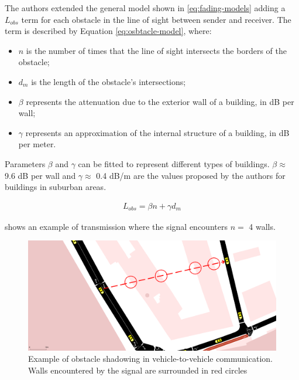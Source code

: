 		The authors extended the general model shown in \ref{eq:fading-models} adding a $L_{obs}$ term for each obstacle in the line of sight between sender and receiver. The term is described by Equation \ref{eq:osbtacle-model}, where:
		\begin{itemize}
			\item $n$ is the number of times that the line of sight intersects the borders of the obstacle;
			\item $d_m$ is the length of the obstacle's intersections;
			\item $\beta$ represents the attenuation due to the exterior wall of a building, in dB per wall;
			\item $\gamma$ represents an approximation of the internal structure of a building, in dB per meter.
		\end{itemize}
		
		
		Parameters $\beta$ and $\gamma$ can be fitted to represent different types of buildings. $\beta \approx$ 9.6 dB per wall and $\gamma \approx$ 0.4 dB/m are the values proposed by the authors for buildings in suburban areas.
		
		\begin{gather}\label{eq:osbtacle-model}
			L_{obs} = \beta n + \gamma d_m
		\end{gather}
	
		 shows an example of transmission where the signal encounters $n =$ 4 walls. 
	
		\begin{figure}[H]
			\centering
			\includegraphics[width=\textwidth]{immagini/sumo-obstacle}
			\caption{Example of obstacle shadowing in vehicle-to-vehicle communication. Walls encountered by the signal are surrounded in red circles}
			\label{fig:sumo-obstacle}
		\end{figure}
	

